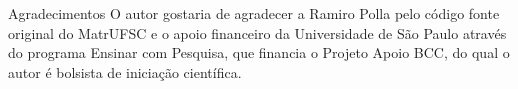 \documentclass[final]{beamer}
\begin{document}
\begin{frame}[t]
\begin{columns}[t]
\begin{column}{0.61\paperwidth} 

\end{column}
\end{columns}

\begin{columns}[t] 
	\begin{column}{0.35\columnwidth}

		\begin{block}{Agradecimentos}
			O autor gostaria de agradecer a Ramiro Polla pelo código fonte original
			do MatrUFSC e o apoio financeiro da Universidade de São
			Paulo através do programa Ensinar com Pesquisa, que financia o Projeto
			Apoio BCC, do qual o autor é bolsista de iniciação científica.
		\end{block}


\end{column}
\end{columns}
\end{frame}
\end{document}
